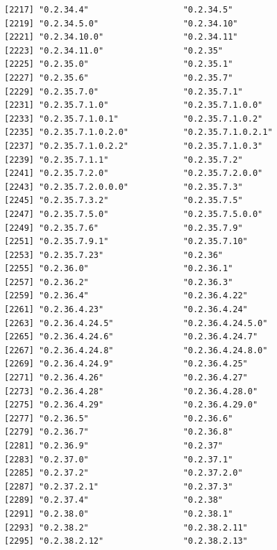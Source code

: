 \documentclass[
  letterpaper,
  DIV=11,
  numbers=noendperiod]{scrreprt}
\begin{document}
\begin{verbatim}
[2217] "0.2.34.4"                   "0.2.34.5"                  
[2219] "0.2.34.5.0"                 "0.2.34.10"                 
[2221] "0.2.34.10.0"                "0.2.34.11"                 
[2223] "0.2.34.11.0"                "0.2.35"                    
[2225] "0.2.35.0"                   "0.2.35.1"                  
[2227] "0.2.35.6"                   "0.2.35.7"                  
[2229] "0.2.35.7.0"                 "0.2.35.7.1"                
[2231] "0.2.35.7.1.0"               "0.2.35.7.1.0.0"            
[2233] "0.2.35.7.1.0.1"             "0.2.35.7.1.0.2"            
[2235] "0.2.35.7.1.0.2.0"           "0.2.35.7.1.0.2.1"          
[2237] "0.2.35.7.1.0.2.2"           "0.2.35.7.1.0.3"            
[2239] "0.2.35.7.1.1"               "0.2.35.7.2"                
[2241] "0.2.35.7.2.0"               "0.2.35.7.2.0.0"            
[2243] "0.2.35.7.2.0.0.0"           "0.2.35.7.3"                
[2245] "0.2.35.7.3.2"               "0.2.35.7.5"                
[2247] "0.2.35.7.5.0"               "0.2.35.7.5.0.0"            
[2249] "0.2.35.7.6"                 "0.2.35.7.9"                
[2251] "0.2.35.7.9.1"               "0.2.35.7.10"               
[2253] "0.2.35.7.23"                "0.2.36"                    
[2255] "0.2.36.0"                   "0.2.36.1"                  
[2257] "0.2.36.2"                   "0.2.36.3"                  
[2259] "0.2.36.4"                   "0.2.36.4.22"               
[2261] "0.2.36.4.23"                "0.2.36.4.24"               
[2263] "0.2.36.4.24.5"              "0.2.36.4.24.5.0"           
[2265] "0.2.36.4.24.6"              "0.2.36.4.24.7"             
[2267] "0.2.36.4.24.8"              "0.2.36.4.24.8.0"           
[2269] "0.2.36.4.24.9"              "0.2.36.4.25"               
[2271] "0.2.36.4.26"                "0.2.36.4.27"               
[2273] "0.2.36.4.28"                "0.2.36.4.28.0"             
[2275] "0.2.36.4.29"                "0.2.36.4.29.0"             
[2277] "0.2.36.5"                   "0.2.36.6"                  
[2279] "0.2.36.7"                   "0.2.36.8"                  
[2281] "0.2.36.9"                   "0.2.37"                    
[2283] "0.2.37.0"                   "0.2.37.1"                  
[2285] "0.2.37.2"                   "0.2.37.2.0"                
[2287] "0.2.37.2.1"                 "0.2.37.3"                  
[2289] "0.2.37.4"                   "0.2.38"                    
[2291] "0.2.38.0"                   "0.2.38.1"                  
[2293] "0.2.38.2"                   "0.2.38.2.11"               
[2295] "0.2.38.2.12"                "0.2.38.2.13"               

\end{verbatim}
\end{document}
